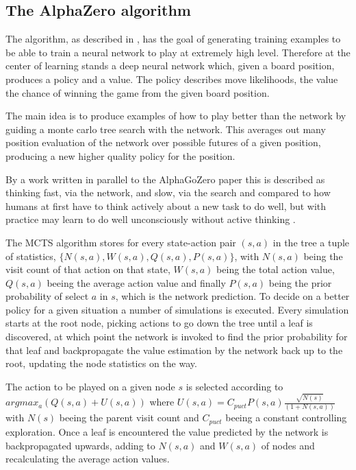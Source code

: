 \documentclass[12pt,onecolumn,oneside,titlepage]{article}
\begin{document}
\subsection{The AlphaZero algorithm}

The algorithm, as described in \cite{silver2018general}, has the goal of generating training examples to be able to train a neural network to play at extremely high level. 
Therefore at the center of learning stands a deep neural network which, given a board position, produces a policy and a value.
The policy describes move likelihoods, the value the chance of winning the game from the given board position.

The main idea is to produce examples of how to play better than the network by guiding a monte carlo tree search with the network. This averages out many position evaluation of the network over possible futures of a given position, producing a new higher quality policy for
the position.

By a work written in parallel to the AlphaGoZero paper this is described as thinking fast, via the network, and slow, 
via the search and compared to how humans at first have to think actively about a new task to do well, but with practice may learn to do well unconsciously without active thinking \cite{anthony2017thinking}.

The MCTS algorithm stores for every state-action pair $(s,a)$ in the tree a tuple of statistics, $\{N(s,a), W(s,a), Q(s,a), P(s,a)\}$, with $N(s,a)$ being the visit count of that action on that state,
$W(s,a)$ being the total action value, $Q(s,a)$ beeing the average action value and finally $P(s,a)$ being the prior probability of select $a$ in $s$, which is the network prediction.
To decide on a better policy for a given situation a number of simulations is executed. Every simulation starts at the root node, picking actions to go down the tree until a leaf is discovered, at which point the network is invoked to find the prior probability
for that leaf and backpropagate the value estimation by the network back up to the root, updating the node statistics on the way.

The action to be played on a given node $s$ is selected according to $argmax_a(Q(s, a) + U(s, a))$ where $U(s,a) = C_{puct} P(s,a) \frac{\sqrt{N(s)}}{(1+N(s,a))}$ with $N(s)$ beeing the parent visit count and $C_{puct}$ beeing a constant controlling exploration.
Once a leaf is encountered the value predicted by the network is backpropagated upwards, adding to $N(s,a)$ and $W(s,a)$ of nodes and recalculating the average action values.
\end{document}
